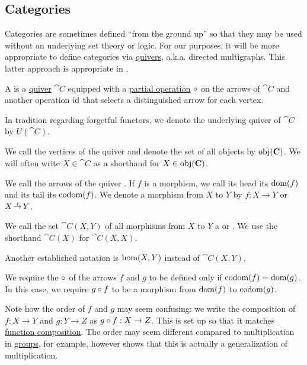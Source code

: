 \subsection{Categories}\label{subsec:categories}

Categories are sometimes defined \enquote{from the ground up} so that they may be used without an underlying set theory or logic. For our purposes, it will be more appropriate to define categories via \hyperref[def:quiver]{quivers}, a.k.a. directed multigraphs. This latter approach is appropriate in \hyperref[def:axiom_of_universes]{}.

\begin{definition}\label{def:category}
  A  is a \hyperref[def:quiver]{quiver} \( \cat{C} \) equipped with a \hyperref[def:partial_function]{partial operation} \( \bincirc \) on the arrows of \( \cat{C} \) and another operation \( \operatorname{id} \) that selects a distinguished arrow for each vertex.

  In tradition regarding forgetful functors, we denote the underlying quiver of \( \cat{C} \) by \( U(\cat{C}) \).

  \begin{thmenum}[series=def:category]
     We call the vertices of the quiver  and denote the set of all objects by \( \operatorname{obj}(\operatorname{\mathbf{C}}) \). We will often write \( X \in \cat{C} \) as a shorthand for \( X \in \operatorname{obj}(\operatorname{\mathbf{C}}) \).

     We call the arrows of the quiver . If \( f \) is a morphism, we call its head its  \( \operatorname{dom}(f) \) and its tail its  \( \operatorname*{co\negthinspace\operatorname{dom}}(f) \). We denote a morphism from \( X \) to \( Y \) by \( f: X \to Y \) or \( X \reloset f \to Y \).

    We call the set \( \cat{C}(X, Y) \) of all morphisms from \( X \) to \( Y \) a  or . We use the shorthand \( \cat{C}(X) \) for \( \cat{C}(X, X) \).

    Another established notation is \( \operatorname{hom}(X, Y) \) instead of \( \cat{C}(X, Y) \).

     We require the  \( \bincirc \) of the arrows \( f \) and \( g \) to be defined only if \( \operatorname*{co\negthinspace\operatorname{dom}}(f) = \operatorname{dom}(g) \). In this case, we require \( g \bincirc f \) to be a morphism from \( \operatorname{dom}(f) \) to \( \operatorname*{co\negthinspace\operatorname{dom}}(g) \).

    Note how the order of \( f \) and \( g \) may seem confusing: we write the composition of \( f: X \to Y \) and \( g: Y \to Z \) as \( g \bincirc f: X \to Z \). This is set up so that it matches \hyperref[def:multi_valued_function/composition]{function composition}. The order may seem different compared to multiplication in \hyperref[def:group]{groups}, for example, however  shows that this is actually a generalization of multiplication.


\end{thmenum}
\end{definition}
